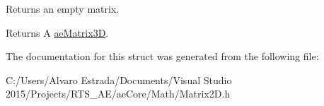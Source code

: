 Returns an empty matrix. 

\begin{DoxyReturn}{Returns}
A \hyperlink{structae_core_1_1ae_matrix3_d}{ae\+Matrix3D}. 
\end{DoxyReturn}


The documentation for this struct was generated from the following file\+:\begin{DoxyCompactItemize}
\item 
C\+:/\+Users/\+Alvaro Estrada/\+Documents/\+Visual Studio 2015/\+Projects/\+R\+T\+S\+\_\+\+A\+E/ae\+Core/\+Math/Matrix2\+D.\+h\end{DoxyCompactItemize}
